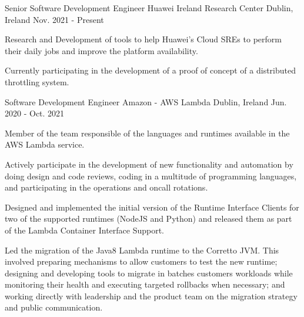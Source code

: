 

\begin{cventries}

  \cventry
    {Senior Software Development Engineer} %
    {Huawei Ireland Research Center} %
    {Dublin, Ireland} %
    {Nov. 2021 - Present} %
    {}
    {
      \begin{cvitems} %
        \item {Research and Development of tools to help Huawei's Cloud SREs to perform their daily jobs and improve the platform availability.}
        \item {Currently participating in the development of a proof of concept of a distributed throttling system.}
      \end{cvitems}
    }
  \cventry
    {Software Development Engineer} %
    {Amazon - AWS Lambda} %
    {Dublin, Ireland} %
    {Jun. 2020 - Oct. 2021} %
    {}
    {
      \begin{cvitems} %
        \item {Member of the team responsible of the languages and runtimes available in the AWS Lambda service.}
        \item {Actively participate in the development of new functionality and automation by doing design and code reviews, coding in a multitude of programming languages, and participating in the operations and oncall rotations.}
        \item {Designed and implemented the initial version of the Runtime Interface Clients for two of the supported runtimes (NodeJS and Python) and released them as part of the Lambda Container Interface Support.}
        \item {Led the migration of the Java8 Lambda runtime to the Corretto JVM. This involved preparing mechanisms to allow customers to test the new runtime; designing and developing tools to migrate in batches customers workloads while monitoring their health and executing targeted rollbacks when necessary; and working directly with leadership and the product team on the migration strategy and public communication.}

\end{cvitems}}
\end{cventries}
